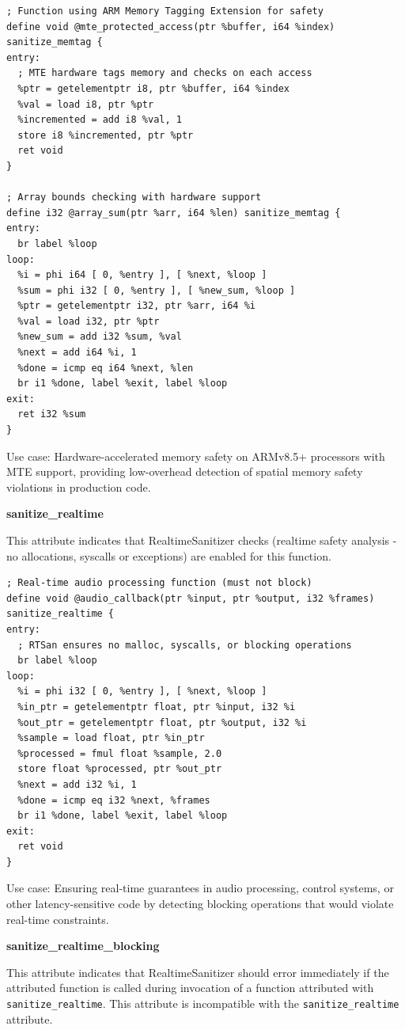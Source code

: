\begin{lstlisting}[style=ir]
; Function using ARM Memory Tagging Extension for safety
define void @mte_protected_access(ptr %buffer, i64 %index) sanitize_memtag {
entry:
  ; MTE hardware tags memory and checks on each access
  %ptr = getelementptr i8, ptr %buffer, i64 %index
  %val = load i8, ptr %ptr
  %incremented = add i8 %val, 1
  store i8 %incremented, ptr %ptr
  ret void
}

; Array bounds checking with hardware support
define i32 @array_sum(ptr %arr, i64 %len) sanitize_memtag {
entry:
  br label %loop
loop:
  %i = phi i64 [ 0, %entry ], [ %next, %loop ]
  %sum = phi i32 [ 0, %entry ], [ %new_sum, %loop ]
  %ptr = getelementptr i32, ptr %arr, i64 %i
  %val = load i32, ptr %ptr
  %new_sum = add i32 %sum, %val
  %next = add i64 %i, 1
  %done = icmp eq i64 %next, %len
  br i1 %done, label %exit, label %loop
exit:
  ret i32 %sum
}
\end{lstlisting}

Use case: Hardware-accelerated memory safety on ARMv8.5+ processors with MTE support, providing low-overhead detection of spatial memory safety violations in production code.

\textbf{sanitize\_realtime}

This attribute indicates that RealtimeSanitizer checks (realtime safety analysis - no allocations, syscalls or exceptions) are enabled for this function.

\begin{lstlisting}[style=ir]
; Real-time audio processing function (must not block)
define void @audio_callback(ptr %input, ptr %output, i32 %frames) sanitize_realtime {
entry:
  ; RTSan ensures no malloc, syscalls, or blocking operations
  br label %loop
loop:
  %i = phi i32 [ 0, %entry ], [ %next, %loop ]
  %in_ptr = getelementptr float, ptr %input, i32 %i
  %out_ptr = getelementptr float, ptr %output, i32 %i
  %sample = load float, ptr %in_ptr
  %processed = fmul float %sample, 2.0
  store float %processed, ptr %out_ptr
  %next = add i32 %i, 1
  %done = icmp eq i32 %next, %frames
  br i1 %done, label %exit, label %loop
exit:
  ret void
}
\end{lstlisting}

Use case: Ensuring real-time guarantees in audio processing, control systems, or other latency-sensitive code by detecting blocking operations that would violate real-time constraints.

\textbf{sanitize\_realtime\_blocking}

This attribute indicates that RealtimeSanitizer should error immediately if the attributed function is called during invocation of a function attributed with \texttt{sanitize\_realtime}.
This attribute is incompatible with the \texttt{sanitize\_realtime} attribute.

